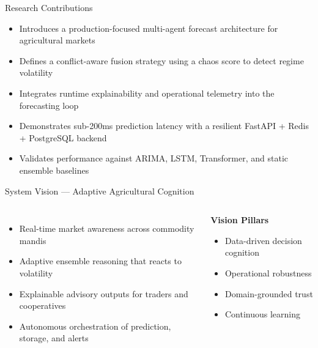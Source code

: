 \documentclass[aspectratio=169,10pt]{beamer}
\newenvironment{herocard}[1][0.98\textwidth]{%
  \begin{center}
  \begin{mdframed}[
    linewidth=0.5pt,
    linecolor=borderLight,
    backgroundcolor=bgCard,
    roundcorner=8pt,
    shadow=true,
    shadowsize=4pt,
    shadowcolor=black!6,
    innertopmargin=8pt,
    innerbottommargin=8pt,
    innerleftmargin=12pt,
    innerrightmargin=12pt
  ]
  \begin{minipage}{#1}
}{%
  \end{minipage}
  \end{mdframed}
  \end{center}
}
\newenvironment{smallcard}[1][0.48\textwidth]{%
  \begin{mdframed}[
    linewidth=0.4pt,
    linecolor=borderLight,
    backgroundcolor=bgCard,
    roundcorner=5pt,
    shadow=true,
    shadowsize=2pt,
    shadowcolor=black!4,
    innertopmargin=5pt,
    innerbottommargin=5pt,
    innerleftmargin=7pt,
    innerrightmargin=7pt
  ]
  \begin{minipage}{#1}
}{%
  \end{minipage}
  \end{mdframed}
}
\begin{document}
\begin{frame}{Research Contributions}
\begin{herocard}
\begin{itemize}
    \small
    \item Introduces a production-focused multi-agent forecast architecture for agricultural markets
    \item Defines a conflict-aware fusion strategy using a chaos score to detect regime volatility
    \item Integrates runtime explainability and operational telemetry into the forecasting loop
    \item Demonstrates sub-200ms prediction latency with a resilient FastAPI + Redis + PostgreSQL backend
    \item Validates performance against ARIMA, LSTM, Transformer, and static ensemble baselines
\end{itemize}
\end{herocard}
\end{frame}

\begin{frame}{System Vision — Adaptive Agricultural Cognition}
\begin{columns}[T]
\begin{itemize}
    \scriptsize
    \item Real-time market awareness across commodity mandis
    \item Adaptive ensemble reasoning that reacts to volatility
    \item Explainable advisory outputs for traders and cooperatives
    \item Autonomous orchestration of prediction, storage, and alerts
\end{itemize}
\begin{smallcard}
\centering\bfseries\color{accentTeal}Vision Pillars
\vspace{0.1cm}
\scriptsize
\begin{itemize}
    \item Data-driven decision cognition
    \item Operational robustness
    \item Domain-grounded trust
    \item Continuous learning
\end{itemize}
\end{smallcard}
\end{columns}
\end{frame}
\end{document}
